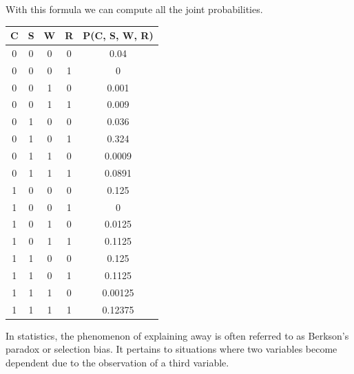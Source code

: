 \begin{example}
\[    \]
    With this formula we can compute all the joint probabilities.
    \begin{table}[H]
        \centering
        \begin{tabular}{cccc|c}
        \hline
        \textbf{C} & \textbf{S} & \textbf{W} & \textbf{R} & \textbf{P(C, S, W, R)} \\ \hline
        0          & 0          & 0          & 0          & 0.04                \\
        0          & 0          & 0          & 1          & 0                   \\
        0          & 0          & 1          & 0          & 0.001               \\
        0          & 0          & 1          & 1          & 0.009               \\
        0          & 1          & 0          & 0          & 0.036               \\
        0          & 1          & 0          & 1          & 0.324               \\
        0          & 1          & 1          & 0          & 0.0009              \\
        0          & 1          & 1          & 1          & 0.0891              \\
        1          & 0          & 0          & 0          & 0.125               \\
        1          & 0          & 0          & 1          & 0                   \\
        1          & 0          & 1          & 0          & 0.0125              \\
        1          & 0          & 1          & 1          & 0.1125              \\
        1          & 1          & 0          & 0          & 0.125               \\
        1          & 1          & 0          & 1          & 0.1125              \\
        1          & 1          & 1          & 0          & 0.00125             \\
        1          & 1          & 1          & 1          & 0.12375             \\ \hline
        \end{tabular}
    \end{table}
\end{example}
In statistics, the phenomenon of explaining away is often referred to as Berkson's paradox or selection bias. It pertains to situations where two variables become dependent due to the observation of a third variable. 
